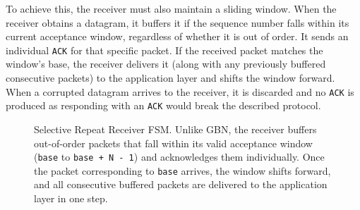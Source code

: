 To achieve this, the receiver must also maintain a sliding window. 
When the receiver obtains a datagram, it buffers it if the sequence number falls within its current acceptance window, regardless of whether it is out of order. It sends an individual \texttt{ACK} for that specific packet. If the received packet matches the window's base, the receiver delivers it (along with any previously buffered consecutive packets) to the application layer and shifts the window forward.
When a corrupted datagram arrives to the receiver, it is discarded and no \texttt{ACK} is produced as responding with an \texttt{ACK} would break the described protocol.

\begin{figure}[htbp]
    \centering
    \caption{Selective Repeat Receiver FSM. Unlike GBN, the receiver buffers out-of-order packets that fall within its valid acceptance window (\texttt{base} to \texttt{base + N - 1}) and acknowledges them individually. Once the packet corresponding to \texttt{base} arrives, the window shifts forward, and all consecutive buffered packets are delivered to the application layer in one step.}
\end{figure}

